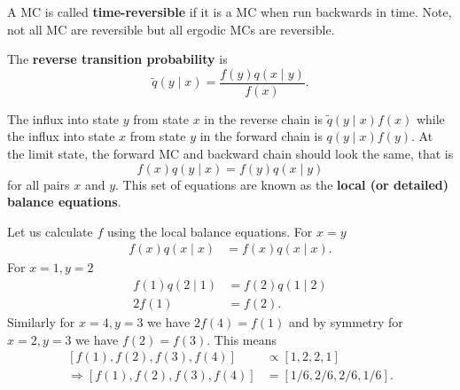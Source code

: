 \begin{defe} \label{defe: trmc}
    A MC is called {\bf time-reversible} if it is a MC when run backwards in time. Note, not all MC are reversible but all ergodic MCs are reversible.
\end{defe}

\begin{defe} \label{defe: rtp}
    The {\bf reverse transition probability} is
    \[
        \tilde{q} (y \mid x) = \frac{f(y) q(x \mid y)}{f(x)}.
    \]
\end{defe}

The influx into state $y$ from state $x$ in the reverse chain is $\tilde{q} (y \mid x) f(x)$ while the influx into state $x$ from state $y$ in the forward chain is $q (y \mid x) f(y)$. At the limit state, the forward MC and backward chain should look the same, that is
\begin{equation*}
    f(x) q(y \mid x) = f(y) q (x \mid y)
\end{equation*}
for all pairs $x$ and $y$. This set of equations are known as the {\bf local (or detailed) balance equations}.

\begin{exam} \label{exam: lbe}
    Let us calculate $f$ using the local balance equations. For $x=y$
    \begin{align*}
        f (x) q(x \mid x) & = f (x) q(x \mid x).
    \end{align*}
    For $x= 1, y=2$
    \begin{align*}
        f(1) q (2 \mid 1) & = f(2) q(1 \mid 2) \\
        2 f(1)            & = f(2).
    \end{align*}
    Similarly for $x=4, y=3$ we have $2 f(4) = f(1)$ and by symmetry for $x=2, y=3$ we have $f(2) = f(3)$. This means
    \begin{align*}
        \left[ f(1), f(2), f(3), f(4) \right]             & \propto \left[ 1,2,2,1 \right]    \\
        \Rightarrow \left[ f(1), f(2), f(3), f(4) \right] & = \left[ 1/6,2/6,2/6,1/6 \right].
    \end{align*}
\end{exam}